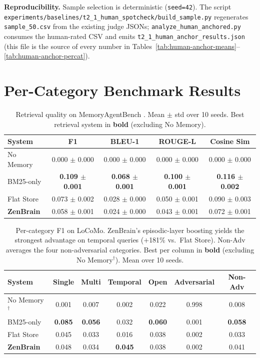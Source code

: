 \documentclass{article}
\begin{document}
\textbf{Reproducibility.} Sample selection is deterministic
(\texttt{seed=42}). The script
\texttt{experiments/baselines/t2\_1\_human\_spotcheck/build\_sample.py}
regenerates \texttt{sample\_50.csv} from the existing judge JSONs;
\texttt{analyze\_human\_anchored.py} consumes the human-rated CSV
and emits \texttt{t2\_1\_human\_anchor\_results.json} (this file is
the source of every number in
Tables~\ref{tab:human-anchor-means}--\ref{tab:human-anchor-percat}).

\section{Per-Category Benchmark Results}
\label{app:per-category}

\begin{table}[h]
    \caption{Retrieval quality on MemoryAgentBench
    \citep{he2025memoryagentbench}. Mean $\pm$ std over 10 seeds.
    Best retrieval system in \textbf{bold} (excluding No Memory).}
    \label{tab:memoryagentbench}
    \centering
    \begin{tabular}{lcccc}
        \toprule
        System & F1 & BLEU-1 & ROUGE-L & Cosine Sim \\
        \midrule
        No Memory & 0.000 $\pm$ 0.000 & 0.000 $\pm$ 0.000 & 0.000 $\pm$ 0.000 & 0.000 $\pm$ 0.000 \\
        BM25-only & \textbf{0.109 $\pm$ 0.001} & \textbf{0.068 $\pm$ 0.001} & \textbf{0.100 $\pm$ 0.001} & \textbf{0.116 $\pm$ 0.002} \\
        Flat Store & 0.073 $\pm$ 0.002 & 0.028 $\pm$ 0.000 & 0.050 $\pm$ 0.001 & 0.090 $\pm$ 0.003 \\
        \textbf{ZenBrain} & 0.058 $\pm$ 0.001 & 0.024 $\pm$ 0.000 & 0.043 $\pm$ 0.001 & 0.072 $\pm$ 0.001 \\
        \bottomrule
    \end{tabular}
\end{table}

\begin{table}[h]
    \caption{Per-category F1 on LoCoMo. ZenBrain's episodic-layer boosting
    yields the strongest advantage on temporal queries ($+$181\% vs.\ Flat Store).
    Non-Adv averages the four non-adversarial categories.
    Best per column in \textbf{bold} (excluding No Memory$^\dagger$).
    Mean over 10 seeds.}
    \label{tab:locomo-categories}
    \centering
    \small
    \begin{tabular}{lcccccc}
        \toprule
        System & Single & Multi & Temporal & Open & Adversarial & Non-Adv \\
        \midrule
        No Memory$^\dagger$ & 0.001 & 0.007 & 0.002 & 0.022 & 0.998 & 0.008 \\
        BM25-only & \textbf{0.085} & \textbf{0.056} & 0.032 & \textbf{0.060} & 0.001 & \textbf{0.058} \\
        Flat Store & 0.045 & 0.033 & 0.016 & 0.038 & 0.002 & 0.033 \\
        \textbf{ZenBrain} & 0.048 & 0.034 & \textbf{0.045} & 0.038 & 0.002 & 0.041 \\
        \bottomrule
    \end{tabular}
\end{table}
\end{document}
